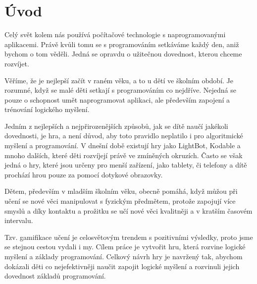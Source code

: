 \chapter{Úvod}

Celý svět kolem nás používá počítačové technologie s naprogramovanými aplikacemi. Právě kvůli tomu se s programováním setkáváme každý den, aniž bychom o tom věděli. Jedná se opravdu o užitečnou dovednost, kterou chceme rozvíjet.\par
Věříme, že je nejlepší začít v raném věku, a to u dětí ve školním období. Je rozumné, když se malé děti setkají s programováním co nejdříve. Nejedná se pouze o schopnost umět naprogramovat aplikaci, ale především zapojení a trénování logického myšlení.\par
Jedním z nejlepších a nejpřirozenějších způsobů, jak se dítě naučí jakékoli dovednosti, je hra, a není důvod, aby toto pravidlo neplatilo i pro algoritmické myšlení a programování. V dnešní době existují hry jako LightBot, Kodable a mnoho dalších, které děti rozvíjejí právě ve zmíněných okruzích. Často se však jedná o hry, které jsou určeny pro menší zařízení, jako tablety, či telefony a dítě prochází hrou pouze za pomocí dotykové obrazovky.\par
Dětem, především v mladším školním věku, obecně pomáhá, když můžou při učení se nové věci manipulovat s fyzickým předmětem, protože zapojují více smyslů a díky kontaktu a prožitku se učí nové věci kvalitněji a v kratším časovém intervalu.\par
Tzv. gamifikace učení je celosvětovým trendem s pozitivními výsledky, proto jsme se stejnou cestou vydali i my. Cílem práce je vytvořit hru, která rozvine logické myšlení a základy programování. Celkový návrh hry je navržený tak, abychom dokázali děti co nejefektivněji naučit zapojit logické myšlení a rozvinuli jejich dovednost základů programování.